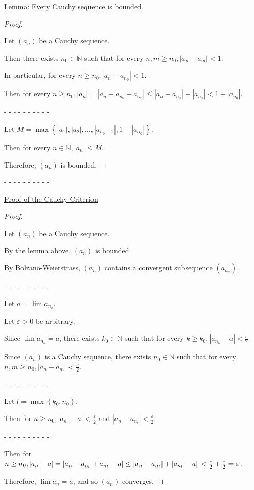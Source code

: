 \documentclass[12pt]{article}
\newcommand{\NN}{\mathbb{N}}
\newcommand\set[1]{\left\lbrace #1 \right\rbrace} %
\newcommand\abs[1]{\left| #1 \right|} %
\newcommand{\eps}{\varepsilon}
\begin{document}
\dotfill

\underline{Lemma}: Every Cauchy sequence is bounded.

\begin{proof}
$ $

Let $(a_n)$ be a Cauchy sequence.

Then there exists $n_0 \in \NN$ such that for every $n, m \ge n_0, \abs{a_n - a_m} < 1$.

In particular, for every $n \ge n_0, \abs{a_n - a_{n_0}} < 1$.

Then for every $n \ge n_0, \abs{a_n} = \abs{a_n - a_{n_0} + a_{n_0}} \le \abs{a_n - a_{n_0}} + \abs{a_{n_0}} < 1 + \abs{a_{n_0}}$.

- - - - - - - - - -

Let $M = \max \set{\abs{a_1}, \abs{a_2}, \dots, \abs{a_{n_0 - 1}}, 1 + \abs{a_{n_0}}}$.

Then for every $n \in \NN, \abs{a_n} \le M$.

Therefore, $(a_n)$ is bounded.
\end{proof}

- - - - - - - - - -

\underline{Proof of the Cauchy Criterion}

\begin{proof}
$ $

Let $(a_n)$ be a Cauchy sequence.

By the lemma above, $(a_n)$ is bounded.

By Bolzano-Weierstrass, $(a_n)$ contains a convergent subsequence $(a_{n_k})$.

- - - - - - - - - -

Let $a = \lim a_{n_k}$.

Let $\eps > 0$ be arbitrary.

Since $\lim a_{n_k} = a$, there exists $k_0 \in \NN$ such that for every $k \ge k_0, \abs{a_{n_k} - a} < \frac{\eps}{2}$.

Since $(a_n)$ is a Cauchy sequence, there exists $n_0 \in \NN$ such that for every
\\
$n, m \ge n_0, \abs{a_n - a_m} < \frac{\eps}{2}$.

- - - - - - - - - -

Let $l = \max \set{k_0, n_0}$.

Then for $n \ge n_0, \abs{a_{n_l} - a} < \frac{\eps}{2}$ and $\abs{a_n - a_{n_l}} < \frac{\eps}{2}$.

- - - - - - - - - -

Then for $n \ge n_0, \abs{a_n - a} = \abs{a_n - a_{n_l} + a_{n_l} - a} \le \abs{a_n - a_{n_l}} + \abs{a_{n_l} - a}
\\
< \frac{\eps}{2} + \frac{\eps}{2} = \eps$.

Therefore, $\lim a_n = a$, and so $(a_n)$ converges.
\end{proof}
\end{document}
